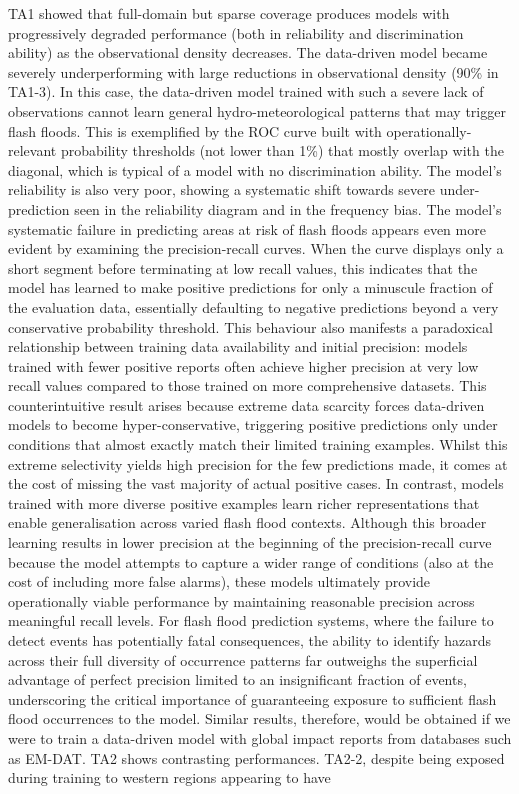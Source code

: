 TA1  showed that full-domain but sparse coverage produces models with progressively degraded performance (both in reliability and discrimination ability) as the observational density decreases. The data-driven model became severely underperforming with large reductions in observational density (90\% in TA1-3). In this case, the data-driven model trained with such a severe lack of observations cannot learn general hydro-meteorological patterns that may trigger flash floods. This is exemplified by the ROC curve built with operationally-relevant probability thresholds (not lower than 1\%) that mostly overlap with the diagonal, which is typical of a model with no discrimination ability. The model's reliability is also very poor, showing a systematic shift towards severe under-prediction seen in the reliability diagram and in the frequency bias. The model's systematic failure in predicting areas at risk of flash floods appears even more evident by examining the precision-recall curves. When the curve displays only a short segment before terminating at low recall values, this indicates that the model has learned to make positive predictions for only a minuscule fraction of the evaluation data, essentially defaulting to negative predictions beyond a very conservative probability threshold. This behaviour also manifests a paradoxical relationship between training data availability and initial precision: models trained with fewer positive reports often achieve higher precision at very low recall values compared to those trained on more comprehensive datasets. This counterintuitive result arises because extreme data scarcity forces data-driven models to become hyper-conservative, triggering positive predictions only under conditions that almost exactly match their limited training examples. Whilst this extreme selectivity yields high precision for the few predictions made, it comes at the cost of missing the vast majority of actual positive cases. In contrast, models trained with more diverse positive examples learn richer representations that enable generalisation across varied flash flood contexts. Although this broader learning results in lower precision at the beginning of the precision-recall curve because the model attempts to capture a wider range of conditions (also at the cost of including more false alarms), these models ultimately provide operationally viable performance by maintaining reasonable precision across meaningful recall levels. For flash flood prediction systems, where the failure to detect events has potentially fatal consequences, the ability to identify hazards across their full diversity of occurrence patterns far outweighs the superficial advantage of perfect precision limited to an insignificant fraction of events, underscoring the critical importance of guaranteeing exposure to sufficient flash flood occurrences to the model. Similar results, therefore, would be obtained if we were to train a data-driven model with global impact reports from databases such as EM-DAT. TA2 shows contrasting performances. TA2-2, despite being exposed during training to western regions appearing to have 